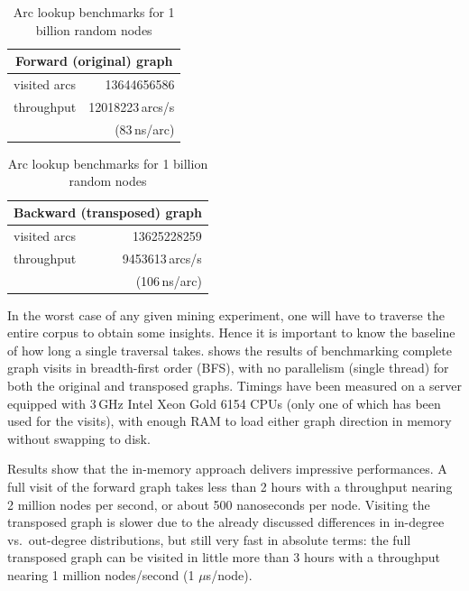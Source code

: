 \begin{table}
  \centering
  \caption{Arc lookup benchmarks for 1 billion random nodes}
  \label{tab:compression-arc-benchmark}


  \hfill
  \begin{tabular}{lr}
    \multicolumn{2}{c}{\textbf{Forward (original) graph}} \\
    \hline\hline
    visited arcs  & \num{13644656586} \\
    throughput    & \num{12018223}\,arcs/s \\
                  & (83\,ns/arc) \\
    \hline
  \end{tabular}
  \hfill
  \begin{tabular}{lr}
    \multicolumn{2}{c}{\textbf{Backward (transposed) graph}} \\
    \hline\hline
    visited arcs  & \num{13625228259} \\
    throughput    & \num{9453613}\,arcs/s \\
                  & (106\,ns/arc) \\
    \hline
  \end{tabular}
  \hfill
\end{table}

In the worst case of any given mining experiment, one will have to traverse the
entire corpus to obtain some insights. Hence it is important to know the
baseline of how long a single traversal takes.
 shows the results of benchmarking complete
graph visits in breadth-first order (BFS), with no parallelism (single thread)
for both the original and transposed graphs. Timings have been measured on a
server equipped with 3\,GHz Intel Xeon Gold 6154 CPUs (only one of which has
been used for the visits), with enough RAM to load either graph direction in
memory without swapping to disk.

Results show that the in-memory approach delivers impressive performances. A
full visit of the forward graph takes less than 2 hours with a throughput
nearing 2 million nodes per second, or about 500 nanoseconds per node. Visiting
the transposed graph is slower due to the already discussed differences in
in-degree vs.\ out-degree distributions, but still very fast in absolute terms:
the full transposed graph can be visited in little more than 3 hours with a
throughput nearing 1 million nodes/second (1 $\mu$s/node).

